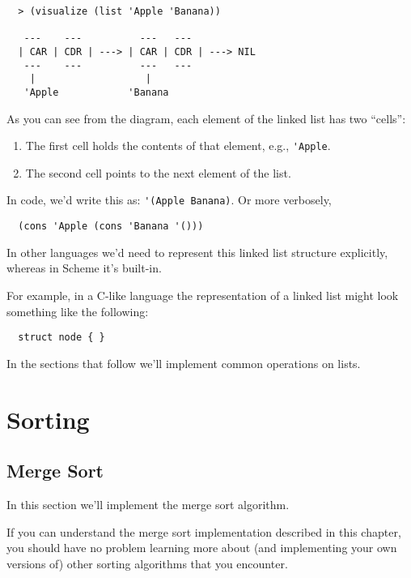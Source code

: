 \documentclass[12pt,openright,draft]{book}
\begin{document}
\begin{verbatim}
  > (visualize (list 'Apple 'Banana))

   ---    ---          ---   ---
  | CAR | CDR | ---> | CAR | CDR | ---> NIL
   ---    ---          ---   ---
    |                   |
   'Apple            'Banana
\end{verbatim}

As you can see from the diagram, each element of the linked list has
two ``cells'':

\begin{enumerate}

\item The first cell holds the contents of that element, e.g.,
  \verb|'Apple|.

\item The second cell points to the next element of the list.

\end{enumerate}

In code, we'd write this as: \verb|'(Apple Banana)|.  Or more
verbosely,

\begin{verbatim}
  (cons 'Apple (cons 'Banana '()))
\end{verbatim}

In other languages we'd need to represent this linked list structure
explicitly, whereas in Scheme it's built-in.

For example, in a C-like language the representation of a linked list
might look something like the following:

\begin{verbatim}
  struct node { }
\end{verbatim}

In the sections that follow we'll implement common operations on
lists.

\section{Sorting}


\subsection{Merge Sort}

In this section we'll implement the merge sort algorithm.

If you can understand the merge sort implementation described in this
chapter, you should have no problem learning more about (and
implementing your own versions of) other sorting algorithms that you
encounter.
\end{document}
